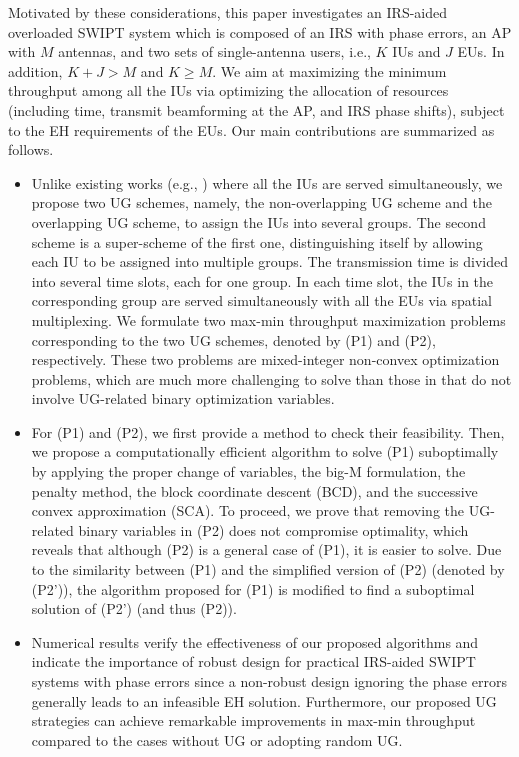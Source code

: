 \documentclass[12pt,draftclsnofoot, onecolumn]{IEEEtran}
\theoremstyle{plain}
\begin{document}
\begin{sloppypar}
Motivated by these considerations, this paper investigates an IRS-aided overloaded SWIPT system which is composed of an IRS with phase errors, an AP with $M$ antennas, and two sets of single-antenna users, i.e., $K$ IUs and $J$ EUs. In addition, $K + J > M$ and $K \geq M$. We aim at maximizing the minimum throughput among all the IUs via optimizing the allocation of resources (including time, transmit beamforming at the AP, and IRS phase shifts), subject to the EH requirements of the EUs. Our main contributions are summarized as follows. 
\begin{itemize}
	\item Unlike existing works (e.g., \cite{2020_Qingqing_SWIPT_letter,2020_Qingqing_SWIPT_QoS,2020_Cunhua_SWIPT,2020_Wei_SWIPT_secure,2021_Shayan_SWIPT}) where all the IUs are served simultaneously, we propose two UG schemes, namely, the non-overlapping UG scheme and the overlapping UG scheme, to assign the IUs into several groups. The second scheme is a super-scheme of the first one, distinguishing itself by allowing each IU to be assigned into multiple groups. 
	The transmission time is divided into several time slots, each for one group. In each time slot, the IUs in the corresponding group are served simultaneously with all the EUs via spatial multiplexing. We formulate two max-min throughput maximization problems corresponding to the two UG schemes, denoted by (P1) and (P2), respectively. These two problems are mixed-integer non-convex optimization problems, which are much more challenging to solve than those in \cite{2020_Qingqing_SWIPT_letter,2020_Qingqing_SWIPT_QoS,2020_Cunhua_SWIPT,2020_Wei_SWIPT_secure,2021_Shayan_SWIPT} that do not involve UG-related binary optimization variables.  
	\item For (P1) and (P2), we first provide a method to check their feasibility. Then, we propose a computationally efficient algorithm to solve (P1) suboptimally by applying the proper change of variables, the big-M formulation, the penalty method, the block coordinate descent (BCD), and the successive convex approximation (SCA). To proceed, we prove that removing the UG-related binary variables in (P2) does not compromise optimality, which reveals that although (P2) is a general case of (P1), it is easier to solve. Due to the similarity between (P1) and the simplified version of (P2) (denoted by (P2')), the algorithm proposed for (P1) is modified to find a suboptimal solution of (P2') (and thus (P2)). 
	\item Numerical results verify the effectiveness of our proposed algorithms and indicate the importance of robust design for practical IRS-aided SWIPT systems with phase errors since a non-robust design ignoring the phase errors generally leads to an infeasible EH solution. Furthermore, our proposed UG strategies can achieve remarkable improvements in max-min throughput compared to the cases without UG or adopting random UG. 

\end{itemize}
\end{sloppypar}
\end{document}
